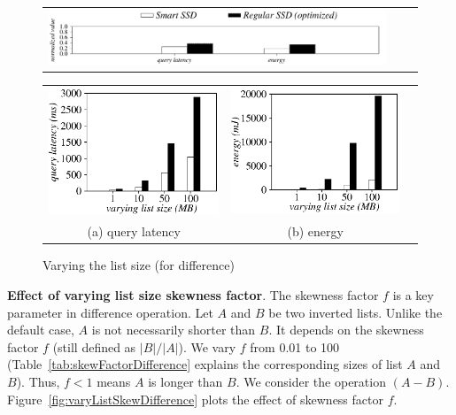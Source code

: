 \begin{figure}[hbtp]
  \centering
    \begin{tabular}{ccc}
 \includegraphics[width=0.52\columnwidth]{figures/banner2.pdf}
\end{tabular}
\vspace{-0.1cm}
\renewcommand{\tabcolsep}{0.1mm}
  \begin{tabular}{ccc}
 \includegraphics[width=0.5\columnwidth]{figures/Difference-time-VaryListLen.eps}&
  \includegraphics[width=0.5\columnwidth]{figures/Difference-energy-VaryListLen.eps}\\
  (a) query latency & (b) energy
\end{tabular}
  \caption{Varying the list size (for difference)}
  \label{fig:varyListSizeDifference}
 \end{figure}



\textbf{Effect of varying list size skewness factor}.
The skewness factor $f$ is a key parameter in \textsf{difference} operation.
Let $A$ and $B$ be two inverted lists. Unlike the default case, $A$ is not necessarily shorter than $B$. It depends on the skewness factor $f$ (still defined as $|B|/|A|$).
We vary $f$ from 0.01 to 100 (Table~\ref{tab:skewFactorDifference} explains the corresponding sizes of list $A$ and $B$). Thus, $f<1$ means $A$ is longer than $B$. We consider the operation $(A-B)$. Figure~\ref{fig:varyListSkewDifference} plots the effect of skewness factor $f$.

